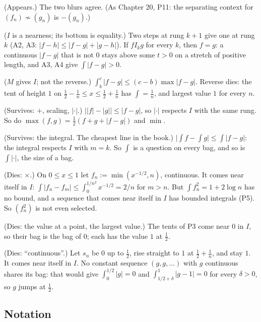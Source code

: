 \begin{lines}
\item[\lab{P1}] (Appears.) The two blurs agree. (As Chapter 20, P11: the separating context for $(f_n) \not\sim (g_n)$ is $-(g_n)$.)
\item[\lab{P2}] ($I$ is a nearness; its bottom is equality.) Two steps at rung $k + 1$ give one at rung $k$ (A2, A3: $|f - h| \le |f - g| + |g - h|$). If $f \mathrel{I_k} g$ for every $k$, then $f = g$: a continuous $|f - g|$ that is not $0$ stays above some $t > 0$ on a stretch of positive length, and A3, A4 give $\int |f - g| > 0$.
\item[\lab{P3}] ($M$ gives $I$; not the reverse.) $\int_b^c |f - g| \le (c - b) \max |f - g|$. Reverse dies: the tent of height $1$ on $\tfrac12 - \tfrac1n \le x \le \tfrac12 + \tfrac1n$ has $\int = \tfrac1n$, and largest value $1$ for every $n$.
\item[\lab{P4}] (Survives: $+$, scaling, $|\cdot|$.) $\bigl||f| - |g|\bigr| \le |f - g|$, so $|\cdot|$ respects $I$ with the same rung. So do $\max(f, g) = \tfrac12(f + g + |f - g|)$ and $\min$.
\item[\lab{P5}] (Survives: the integral. The cheapest line in the book.) $\bigl|\int f - \int g\bigr| \le \int |f - g|$: the integral respects $I$ with $m = k$. So $\int$ is a question on every bag, and so is $\int |\cdot|$, the size of a bag.
\item[\lab{P6}] (Dies: $\times$.) On $0 \le x \le 1$ let $f_n := \min(x^{-1/2}, n)$, continuous. It comes near itself in $I$: $\int |f_n - f_m| \le \int_0^{1/n^2} x^{-1/2} = 2/n$ for $m > n$. But $\int f_n^2 = 1 + 2 \log n$ has no bound, and a sequence that comes near itself in $I$ has bounded integrals (P5). So $(f_n^2)$ is not even selected.
\item[\lab{P7}] (Dies: the value at a point, the largest value.) The tents of P3 come near $0$ in $I$, so their bag is the bag of $0$; each has the value $1$ at $\tfrac12$.
\item[\lab{P8}] (Dies: ``continuous''.) Let $s_n$ be $0$ up to $\tfrac12$, rise straight to $1$ at $\tfrac12 + \tfrac1n$, and stay $1$. It comes near itself in $I$. No constant sequence $(g, g, \dots)$ with $g$ continuous shares its bag: that would give $\int_0^{1/2} |g| = 0$ and $\int_{1/2 + \delta}^1 |g - 1| = 0$ for every $\delta > 0$, so $g$ jumps at $\tfrac12$.
\end{lines}

\subsection*{Notation}

